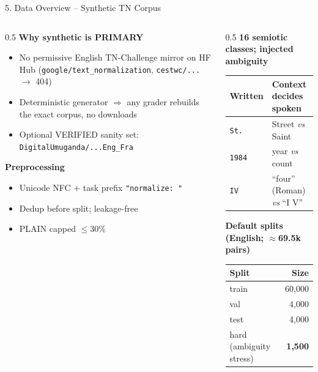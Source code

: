 \documentclass[10pt,aspectratio=169]{beamer}
\begin{document}
\begin{frame}{5. Data Overview -- Synthetic TN Corpus}
\begin{columns}[T]
\begin{column}{0.5\textwidth}
\textbf{Why synthetic is PRIMARY}
\begin{itemize}\small
  \item No permissive English TN-Challenge mirror on HF Hub (\texttt{google/text\_normalization}, \texttt{cestwc/...} $\rightarrow$ 404)
  \item Deterministic generator $\Rightarrow$ any grader rebuilds the exact corpus, no downloads
  \item Optional VERIFIED sanity set: \texttt{DigitalUmuganda/...Eng\_Fra}
\end{itemize}

\textbf{Preprocessing}
\begin{itemize}\small
  \item Unicode NFC + task prefix \texttt{"normalize: "}
  \item Dedup before split; leakage-free
  \item PLAIN capped $\le$30\%
\end{itemize}
\end{column}
\begin{column}{0.5\textwidth}
\textbf{16 semiotic classes; injected ambiguity}
\begin{table}[h]
\centering\scriptsize
\begin{tabular}{ll}
\toprule
\textbf{Written} & \textbf{Context decides spoken} \\
\midrule
\texttt{St.} & Street \emph{vs} Saint \\
\texttt{1984} & year \emph{vs} count \\
\texttt{IV} & ``four'' (Roman) \emph{vs} ``I V'' \\
\bottomrule
\end{tabular}
\end{table}

\textbf{Default splits (English; $\approx$69.5k pairs)}
\begin{table}[h]
\centering\small
\begin{tabular}{lr}
\toprule
\textbf{Split} & \textbf{Size} \\
\midrule
train & 60,000 \\
val & 4,000 \\
test & 4,000 \\
hard (ambiguity stress) & \textbf{1,500} \\
\bottomrule
\end{tabular}
\end{table}
\end{column}
\end{columns}
\end{frame}
\end{document}
